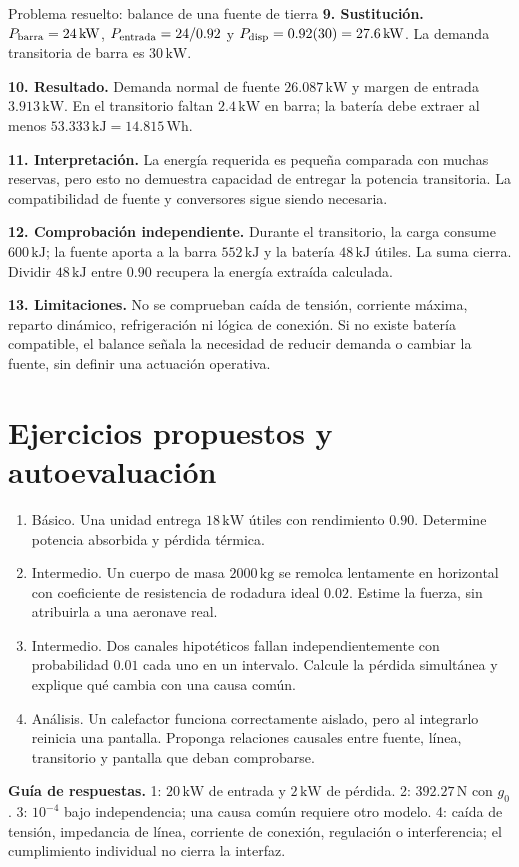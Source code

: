 \begin{studiumworked}{Problema resuelto: balance de una fuente de tierra}
\textbf{9. Sustitución.} $P_{\rm barra}=24\,\mathrm{kW}$, $P_{\rm entrada}=24/0.92$ y $P_{\rm disp}=0.92(30)=27.6\,\mathrm{kW}$. La demanda transitoria de barra es $30\,\mathrm{kW}$.

\textbf{10. Resultado.} Demanda normal de fuente $26.087\,\mathrm{kW}$ y margen de entrada $3.913\,\mathrm{kW}$. En el transitorio faltan $2.4\,\mathrm{kW}$ en barra; la batería debe extraer al menos $53.333\,\mathrm{kJ}=14.815\,\mathrm{Wh}$.

\textbf{11. Interpretación.} La energía requerida es pequeña comparada con muchas reservas, pero esto no demuestra capacidad de entregar la potencia transitoria. La compatibilidad de fuente y conversores sigue siendo necesaria.

\textbf{12. Comprobación independiente.} Durante el transitorio, la carga consume $600\,\mathrm{kJ}$; la fuente aporta a la barra $552\,\mathrm{kJ}$ y la batería $48\,\mathrm{kJ}$ útiles. La suma cierra. Dividir $48\,\mathrm{kJ}$ entre $0.90$ recupera la energía extraída calculada.

\textbf{13. Limitaciones.} No se comprueban caída de tensión, corriente máxima, reparto dinámico, refrigeración ni lógica de conexión. Si no existe batería compatible, el balance señala la necesidad de reducir demanda o cambiar la fuente, sin definir una actuación operativa.


\end{studiumworked}

\section{Ejercicios propuestos y autoevaluación}
\begin{enumerate}
\item Básico. Una unidad entrega $18\,\mathrm{kW}$ útiles con rendimiento $0.90$. Determine potencia absorbida y pérdida térmica.
\item Intermedio. Un cuerpo de masa $2000\,\mathrm{kg}$ se remolca lentamente en horizontal con coeficiente de resistencia de rodadura ideal $0.02$. Estime la fuerza, sin atribuirla a una aeronave real.
\item Intermedio. Dos canales hipotéticos fallan independientemente con probabilidad $0.01$ cada uno en un intervalo. Calcule la pérdida simultánea y explique qué cambia con una causa común.
\item Análisis. Un calefactor funciona correctamente aislado, pero al integrarlo reinicia una pantalla. Proponga relaciones causales entre fuente, línea, transitorio y pantalla que deban comprobarse.
\end{enumerate}
\textbf{Guía de respuestas.} 1: $20\,\mathrm{kW}$ de entrada y $2\,\mathrm{kW}$ de pérdida. 2: $392.27\,\mathrm{N}$ con $g_0$. 3: $10^{-4}$ bajo independencia; una causa común requiere otro modelo. 4: caída de tensión, impedancia de línea, corriente de conexión, regulación o interferencia; el cumplimiento individual no cierra la interfaz.

